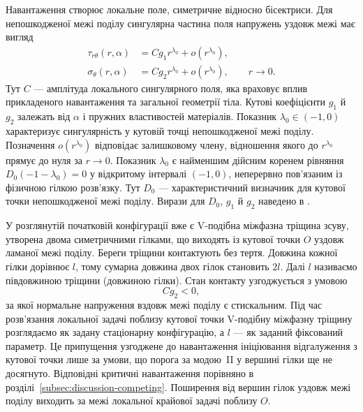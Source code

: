 Навантаження створює локальне поле, симетричне відносно бісектриси. Для непошкодженої межі поділу сингулярна частина поля напружень уздовж межі має вигляд
\begin{equation*}
\begin{aligned}
  \tau_{r\theta}(r,\alpha)
    &= Cg_1 r^{\lambda_0}+o\!\left(r^{\lambda_0}\right),\\
  \sigma_\theta(r,\alpha)
    &= Cg_2 r^{\lambda_0}+o\!\left(r^{\lambda_0}\right),
    \qquad r\to0.
\end{aligned}
\end{equation*}
Тут $C$ — амплітуда локального сингулярного поля, яка враховує вплив прикладеного навантаження та загальної геометрії тіла. Кутові коефіцієнти $g_1$ й $g_2$ залежать від $\alpha$ і пружних властивостей матеріалів. Показник $\lambda_0\in(-1,0)$ характеризує сингулярність у кутовій точці непошкодженої межі поділу. Позначення $o(r^{\lambda_0})$ відповідає залишковому члену, відношення якого до $r^{\lambda_0}$ прямує до нуля за $r\to0$. Показник $\lambda_0$ є найменшим дійсним коренем рівняння $D_0(-1-\lambda_0)=0$ у відкритому інтервалі $(-1,0)$, неперервно пов’язаним із фізичною гілкою розв’язку. Тут $D_0$ — характеристичний визначник для кутової точки непошкодженої межі поділу. Вирази для $D_0$, $g_1$ й $g_2$ наведено в \AsymptoticsAppendix.

У розглянутій початковій конфігурації вже є V-подібна міжфазна тріщина зсуву, утворена двома симетричними гілками, що виходять із кутової точки $O$ уздовж ламаної межі поділу. Береги тріщини контактують без тертя. Довжина кожної гілки дорівнює $l$, тому сумарна довжина двох гілок становить $2l$. Далі $l$ називаємо півдовжиною тріщини (довжиною гілки). Стан контакту узгоджується з умовою
\begin{equation*}
  Cg_2<0,
\end{equation*}
за якої нормальне напруження вздовж межі поділу є стискальним. Під час розв’язання локальної задачі поблизу кутової точки V-подібну міжфазну тріщину розглядаємо як задану стаціонарну конфігурацію, а $l$ — як заданий фіксований параметр. Це припущення узгоджене до навантаження ініціювання відгалуження з кутової точки лише за умови, що порога за модою~II у вершині гілки ще не досягнуто. Відповідні критичні навантаження порівняно в розділі~\ref{subsec:discussion-competing}. Поширення від вершин гілок уздовж межі поділу виходить за межі локальної крайової задачі поблизу $O$.

